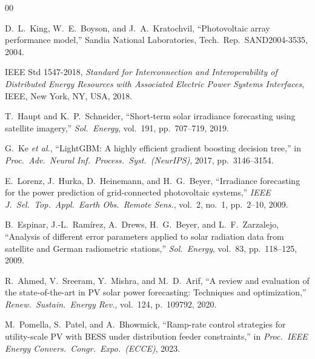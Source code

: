 \documentclass[conference]{IEEEtran}
\begin{document}
\begin{thebibliography}{00}

D.~L.~King, W.~E.~Boyson, and J.~A.~Kratochvil,
``Photovoltaic array performance model,''
Sandia National Laboratories, Tech.\ Rep.\ SAND2004-3535, 2004.

IEEE Std 1547-2018,
\emph{Standard for Interconnection and Interoperability of Distributed Energy
Resources with Associated Electric Power Systems Interfaces},
IEEE, New York, NY, USA, 2018.

T.~Haupt and K.~P.~Schneider,
``Short-term solar irradiance forecasting using satellite imagery,''
\emph{Sol.\ Energy}, vol.~191, pp.~707--719, 2019.

G.~Ke \emph{et al.},
``LightGBM: A highly efficient gradient boosting decision tree,''
in \emph{Proc.\ Adv.\ Neural Inf.\ Process.\ Syst.\ (NeurIPS)},
2017, pp.~3146--3154.

E.~Lorenz, J.~Hurka, D.~Heinemann, and H.~G.~Beyer,
``Irradiance forecasting for the power prediction of grid-connected
photovoltaic systems,''
\emph{IEEE J.\ Sel.\ Top.\ Appl.\ Earth Obs.\ Remote Sens.},
vol.~2, no.~1, pp.~2--10, 2009.

B.~Espinar, J.-L.~Ram\'{i}rez, A.~Drews, H.~G.~Beyer, and L.~F.~Zarzalejo,
``Analysis of different error parameters applied to solar radiation data from
satellite and German radiometric stations,''
\emph{Sol.\ Energy}, vol.~83, pp.~118--125, 2009.

R.~Ahmed, V.~Sreeram, Y.~Mishra, and M.~D.~Arif,
``A review and evaluation of the state-of-the-art in PV solar power
forecasting: Techniques and optimization,''
\emph{Renew.\ Sustain.\ Energy Rev.}, vol.~124, p.~109792, 2020.

M.~Pomella, S.~Patel, and A.~Bhowmick,
``Ramp-rate control strategies for utility-scale PV with BESS under
distribution feeder constraints,''
in \emph{Proc.\ IEEE Energy Convers.\ Congr.\ Expo.\ (ECCE)}, 2023.

\end{thebibliography}
\end{document}
